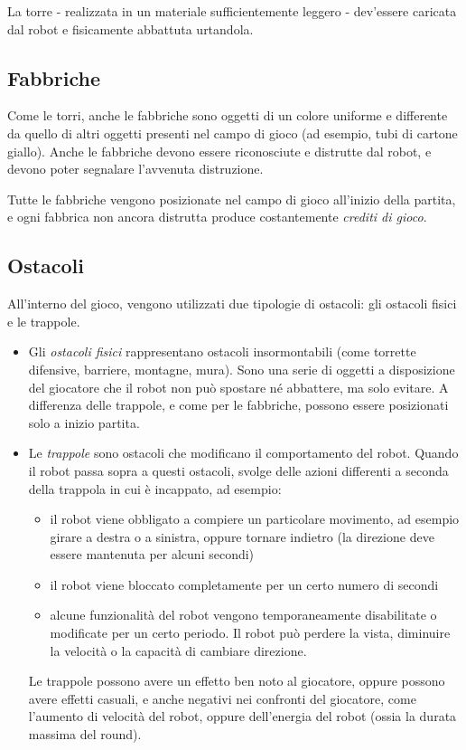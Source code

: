 La torre - realizzata in un materiale sufficientemente leggero - dev'essere caricata dal robot e fisicamente abbattuta urtandola.

\subsection*{Fabbriche} Come le torri, anche le fabbriche sono oggetti di un colore uniforme e differente da quello di altri oggetti presenti nel campo di gioco (ad esempio, tubi di cartone giallo). Anche le fabbriche devono essere riconosciute e distrutte dal robot, e devono poter segnalare l'avvenuta distruzione.

Tutte le fabbriche vengono posizionate nel campo di gioco all'inizio della partita, e ogni fabbrica non ancora distrutta produce costantemente \emph{crediti di gioco}.

\subsection*{Ostacoli} All'interno del gioco, vengono utilizzati due tipologie di ostacoli: gli ostacoli fisici e le trappole.
	\begin{itemize}
	\item Gli \emph{ostacoli fisici} rappresentano ostacoli insormontabili (come torrette difensive, barriere, montagne, mura). Sono una serie di oggetti a disposizione del giocatore che il robot non può spostare né abbattere, ma solo evitare. A differenza delle trappole, e come per le fabbriche, possono essere posizionati solo a inizio partita.
	\item Le \emph{trappole} sono ostacoli che modificano il comportamento del robot. Quando il robot passa sopra a questi ostacoli, svolge delle azioni differenti a seconda della trappola in cui è incappato, ad esempio:
		\begin{itemize}
		\item il robot viene obbligato a compiere un particolare movimento, ad esempio girare a destra o a sinistra, oppure tornare indietro (la direzione deve essere mantenuta per alcuni secondi)
		\item il robot viene bloccato completamente per un certo numero di secondi
		\item alcune funzionalità del robot vengono temporaneamente disabilitate o modificate per un certo periodo. Il robot può perdere la vista, diminuire la velocità o la capacità di cambiare direzione.
		\end{itemize}
	Le trappole possono avere un effetto ben noto al giocatore, oppure possono avere effetti casuali, e anche negativi nei confronti del giocatore, come l'aumento di velocità del robot, oppure dell'energia del robot (ossia la durata massima del round).
	\end{itemize}

